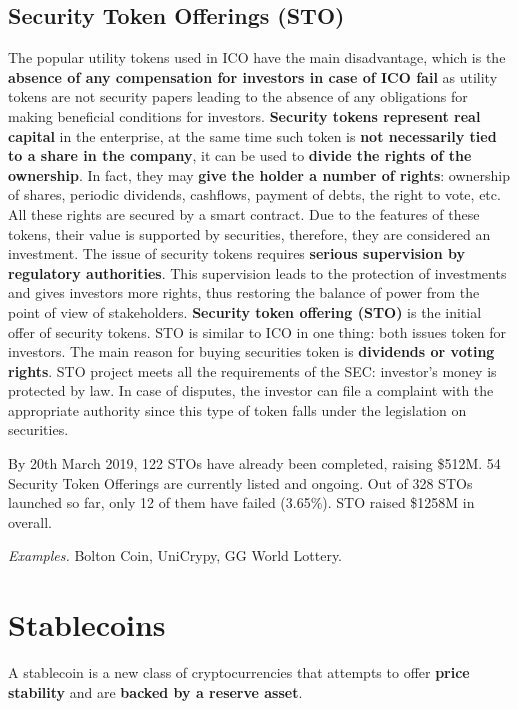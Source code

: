 \subsection{Security Token Offerings (STO)}

The popular utility tokens used in ICO have the main disadvantage, which is the \textbf{absence of any compensation for investors in case of ICO fail} as utility tokens are not security papers leading to the absence of any obligations for making beneficial conditions for investors.
\textbf{Security tokens represent real capital} in the enterprise, at the same time such token is \textbf{not necessarily tied to a share in the company}, it can be used to \textbf{divide the rights of the ownership}. In fact, they may \textbf{give the holder a number of rights}: ownership of shares, periodic dividends, cashflows, payment of debts, the right to vote, etc. All these rights are secured by a smart contract. Due to the features of these tokens, their value is supported by securities, therefore, they are considered an investment.
The issue of security tokens requires \textbf{serious supervision by regulatory authorities}. This supervision leads to the protection of investments and gives investors more rights, thus restoring the balance of power from the point of view of stakeholders.
\textbf{Security token offering (STO)} is the initial offer of security tokens. STO is similar to ICO in one thing: both issues token for investors. The main reason for buying securities token is \textbf{dividends or voting rights}.
STO project meets all the requirements of the SEC: investor's money is protected by law. In case of disputes, the investor can file a complaint with the appropriate authority since this type of token falls under the legislation on securities.

By 20th March 2019, 122 STOs have already been completed, raising \$512M.
54 Security Token Offerings are currently listed and ongoing.
Out of 328 STOs launched so far, only 12 of them have failed (3.65\%). STO raised \$1258M in overall.

\emph{Examples.} Bolton Coin, UniCrypy, GG World Lottery.


\section{Stablecoins}

A stablecoin is a new class of cryptocurrencies that attempts to offer \textbf{price stability} and are \textbf{backed by a reserve asset}.

